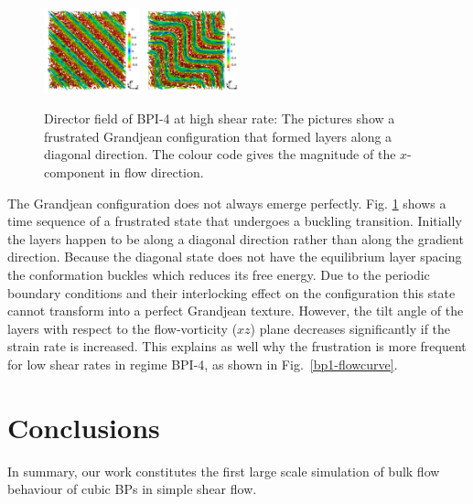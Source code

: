 \documentclass[8.5pt,twoside,twocolumn]{article}
\begin{document}
\begin{figure}[htpb]
\includegraphics[width=0.245\textwidth]{dir3d+y-450k_run916r.png}\nolinebreak
\includegraphics[width=0.245\textwidth]{dir3d+y-800k_run916r.png}
\caption{
Director field of BPI-4 at high shear rate: The pictures show a frustrated 
Grandjean configuration that formed layers along a diagonal direction. 
The colour code gives the magnitude of the $x$-component in flow direction. 
}
\label{bp1-4-frust}
\end{figure}


The Grandjean configuration does not always emerge perfectly.
Fig. \ref{bp1-4-frust} shows a time sequence of a frustrated state 
that undergoes a buckling transition.
Initially the layers happen to be along a diagonal direction rather than
along the gradient direction. 
Because the diagonal state does not have the equilibrium layer spacing the conformation 
buckles which reduces its free energy.
Due to the periodic boundary conditions and their interlocking effect on the configuration 
this state cannot transform into a perfect Grandjean texture. However, the tilt angle of the
layers with respect to the flow-vorticity ($xz$) plane decreases significantly if the 
strain rate is increased.
This explains as well why the frustration is more frequent for low shear rates 
in regime BPI-4, as shown in Fig.~\ref{bp1-flowcurve}.


\section{Conclusions}

In summary, our work constitutes the first large scale simulation of bulk flow behaviour 
of cubic BPs in simple shear flow. 
  
\end{document}
